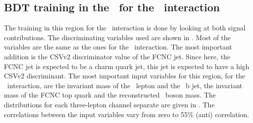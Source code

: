 \clearpage
\subsection{BDT training in the \TTSR\ for the \Zct\ interaction}
\label{sec:BDTTTSRZCT}
The training in this region for the \Zct\ interaction is done by looking at both signal contributions. The discriminating variables used are shown in . Most of the variables are the same as the ones for the \Zut\ interaction. The most important addition is the CSVv2 discriminator value of the FCNC jet. Since here, the FCNC jet is expected to be a charm quark jet, this jet is expected to have a high CSVv2 discriminant. The most important input variables for this region, for the \Zct\ interaction, are the invariant mass of the \PW\ lepton and the \SM\ b jet,  the invariant mass of the FCNC top quark and the reconstructed \PZ\ boson mass. The distributions for each three-lepton channel separate are given in .
The correlations between the input  variables vary from zero to 55\% (anti) correlation. 
